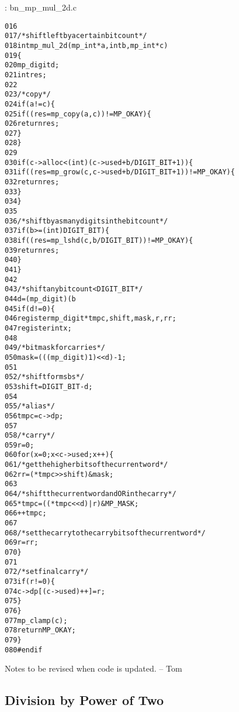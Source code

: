 \documentclass[b5paper]{book}
\begin{document}
\vspace{+3mm}\begin{small}
\hspace{-5.1mm}{\bf File}: bn\_mp\_mul\_2d.c
\vspace{-3mm}
\begin{alltt}
016   
017   /* shift left by a certain bit count */
018   int mp_mul_2d (mp_int * a, int b, mp_int * c)
019   \{
020     mp_digit d;
021     int      res;
022   
023     /* copy */
024     if (a != c) \{
025        if ((res = mp_copy (a, c)) != MP_OKAY) \{
026          return res;
027        \}
028     \}
029   
030     if (c->alloc < (int)(c->used + b/DIGIT_BIT + 1)) \{
031        if ((res = mp_grow (c, c->used + b / DIGIT_BIT + 1)) != MP_OKAY) \{
032          return res;
033        \}
034     \}
035   
036     /* shift by as many digits in the bit count */
037     if (b >= (int)DIGIT_BIT) \{
038       if ((res = mp_lshd (c, b / DIGIT_BIT)) != MP_OKAY) \{
039         return res;
040       \}
041     \}
042   
043     /* shift any bit count < DIGIT_BIT */
044     d = (mp_digit) (b % DIGIT_BIT);
045     if (d != 0) \{
046       register mp_digit *tmpc, shift, mask, r, rr;
047       register int x;
048   
049       /* bitmask for carries */
050       mask = (((mp_digit)1) << d) - 1;
051   
052       /* shift for msbs */
053       shift = DIGIT_BIT - d;
054   
055       /* alias */
056       tmpc = c->dp;
057   
058       /* carry */
059       r    = 0;
060       for (x = 0; x < c->used; x++) \{
061         /* get the higher bits of the current word */
062         rr = (*tmpc >> shift) & mask;
063   
064         /* shift the current word and OR in the carry */
065         *tmpc = ((*tmpc << d) | r) & MP_MASK;
066         ++tmpc;
067   
068         /* set the carry to the carry bits of the current word */
069         r = rr;
070       \}
071       
072       /* set final carry */
073       if (r != 0) \{
074          c->dp[(c->used)++] = r;
075       \}
076     \}
077     mp_clamp (c);
078     return MP_OKAY;
079   \}
080   #endif
\end{alltt}
\end{small}

Notes to be revised when code is updated. -- Tom

\subsection{Division by Power of Two}
\end{document}
